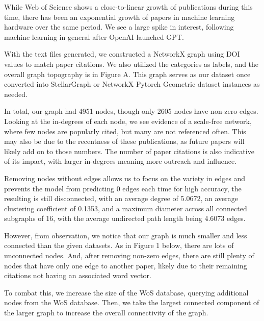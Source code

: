 \documentclass[conference]{IEEEtran}
\begin{document}
While Web of Science shows a close-to-linear growth of publications during this time, 
there has been an exponential growth of papers in machine learning hardware over the 
same period. We see a large spike in interest, following machine learning in general 
after OpenAI launched GPT. \par

With the text files generated, we constructed a NetworkX graph using DOI values to 
match paper citations. We also utilized the categories as labels, and the overall 
graph topography is in Figure A. This graph serves as our dataset once converted 
into StellarGraph or NetworkX Pytorch Geometric dataset instances as needed. \par 

In total, our graph had 4951 nodes, though only 2605 nodes have non-zero edges. 
Looking at the in-degrees of each node, we see evidence of a scale-free network, 
where few nodes are popularly cited, but many are not referenced often. This may 
also be due to the recentness of these publications, as future papers will likely 
add on to those numbers. The number of paper citations is also indicative of its 
impact, with larger in-degrees meaning more outreach and influence. \par 

Removing nodes without edges allows us to focus on the variety in edges and prevents 
the model from predicting 0 edges each time for high accuracy, the resulting is 
still disconnected, with an average degree of 5.0672, an average clustering coefficient 
of 0.1353, and a maximum diameter across all connected subgraphs of 16, 
with the average undirected path length being 4.6073 edges. \par 

However, from observation, we notice that our graph is much smaller and less connected 
than the given datasets. As in Figure 1 below, there are lots of unconnected nodes. 
And, after removing non-zero edges, there are still plenty of nodes that have only 
one edge to another paper, likely due to their remaining citations not having an associated 
word vector. \par 

To combat this, we increase the size of the WoS database, querying additional nodes from the 
WoS database. Then, we take the largest connected component of the 
larger graph to increase the overall connectivity of the graph. \par
\end{document}
